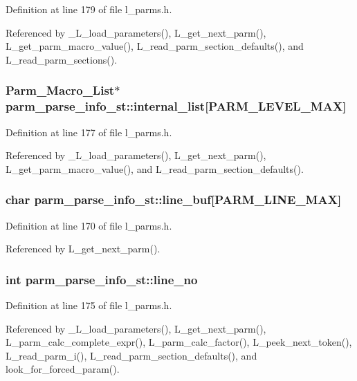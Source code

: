 Definition at line 179 of file l\_\-parms.h.

Referenced by \_\-L\_\-load\_\-parameters(), L\_\-get\_\-next\_\-parm(), L\_\-get\_\-parm\_\-macro\_\-value(), L\_\-read\_\-parm\_\-section\_\-defaults(), and L\_\-read\_\-parm\_\-sections().
\subsubsection{\setlength{\rightskip}{0pt plus 5cm}\bf{Parm\_\-Macro\_\-List}$\ast$ \bf{parm\_\-parse\_\-info\_\-st::internal\_\-list}[PARM\_\-LEVEL\_\-MAX]}\label{structparm__parse__info__st_96eede8ab3525eab8199d38dd5d3c7cb}




Definition at line 177 of file l\_\-parms.h.

Referenced by \_\-L\_\-load\_\-parameters(), L\_\-get\_\-next\_\-parm(), L\_\-get\_\-parm\_\-macro\_\-value(), and L\_\-read\_\-parm\_\-section\_\-defaults().
\subsubsection{\setlength{\rightskip}{0pt plus 5cm}char \bf{parm\_\-parse\_\-info\_\-st::line\_\-buf}[PARM\_\-LINE\_\-MAX]}\label{structparm__parse__info__st_c665658a60ac4b3e797cff7c3c6f3ef7}




Definition at line 170 of file l\_\-parms.h.

Referenced by L\_\-get\_\-next\_\-parm().
\subsubsection{\setlength{\rightskip}{0pt plus 5cm}int \bf{parm\_\-parse\_\-info\_\-st::line\_\-no}}\label{structparm__parse__info__st_273f11c637779d64b112ec663692d5f4}




Definition at line 175 of file l\_\-parms.h.

Referenced by \_\-L\_\-load\_\-parameters(), L\_\-get\_\-next\_\-parm(), L\_\-parm\_\-calc\_\-complete\_\-expr(), L\_\-parm\_\-calc\_\-factor(), L\_\-peek\_\-next\_\-token(), L\_\-read\_\-parm\_\-i(), L\_\-read\_\-parm\_\-section\_\-defaults(), and look\_\-for\_\-forced\_\-param().
